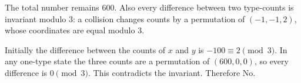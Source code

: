 The total number remains $600$. Also every difference between two type-counts is invariant modulo $3$: a collision changes counts by a permutation of $(-1,-1,2)$, whose coordinates are equal modulo $3$.

Initially the difference between the counts of $x$ and $y$ is $-100\equiv2\pmod3$. In any one-type state the three counts are a permutation of $(600,0,0)$, so every difference is $0\pmod3$. This contradicts the invariant. Therefore $\boxed{\text{No}}$.
